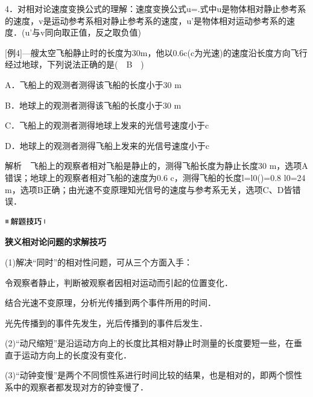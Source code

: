 4．对相对论速度变换公式的理解：速度变换公式u=.式中u是物体相对静止参考系的速度，v是运动参考系相对静止参考系的速度，u'是物体相对运动参考系的速度．(u'与v同向取正值，反之取负值)

{[}例4{]}---艘太空飞船静止时的长度为30m，他以0.6c(c为光速)的速度沿长度方向飞行经过地球，下列说法正确的是(　B　)

A．飞船上的观测者测得该飞船的长度小于30 m

B．地球上的观测者测得该飞船的长度小于30 m

C．飞船上的观测者测得地球上发来的光信号速度小于c

D．地球上的观测者测得飞船上发来的光信号速度小于c

解析　飞船上的观察者相对飞船是静止的，测得飞船长度为静止长度30
m，选项A错误；地球上的观察者相对飞船的速度为0.6
c，测得飞船的长度l=l0()=0.8 l0=24
m，选项B正确；由光速不变原理知光信号的速度与参考系无关，选项C、D皆错误．

\begin{center}\includegraphics[width=0.70764in,height=0.12292in]{media/image37.png}\end{center}
\begin{center}
  \textbf{狭义相对论问题的求解技巧}
\end{center}

(1)解决``同时''的相对性问题，可从三个方面入手：

令观察者静止，判断被观察者因相对运动而引起的位置变化．

结合光速不变原理，分析光传播到两个事件所用的时间．

光先传播到的事件先发生，光后传播到的事件后发生．

(2)``动尺缩短''是沿运动方向上的长度比其相对静止时测量的长度要短一些，在垂直于运动方向上的长度没有变化．

(3)``动钟变慢''是两个不同惯性系进行时间比较的结果，也是相对的，即两个惯性系中的观察者都发现对方的钟变慢了．
